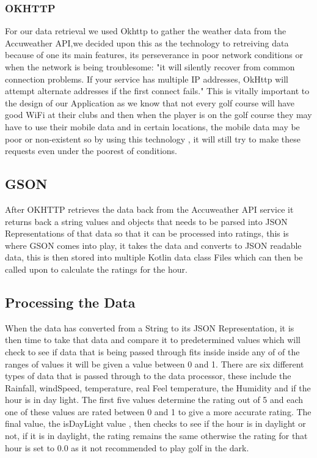 \subsubsection{OKHTTP}
For our data retrieval we used Okhttp to gather the weather data from the Accuweather API,we decided upon this as the technology to retreiving data because of one its main features, its perseverance in poor network conditions or when the network is being troublesome: "it will silently recover from common connection problems. If your service has multiple IP addresses, OkHttp will attempt alternate addresses if the first connect fails."\cite{ref1}
\newline
\newline
This is vitally important to the design of our Application as we know that not every golf course will have good WiFi at their clubs and then when the player is on the golf course they may have to use their mobile data and in certain locations, the mobile data may be poor or non-existent so by using this technology , it will still try to make these requests even under the poorest of conditions.

\subsection{GSON}
After OKHTTP retrieves the data back from the Accuweather API service it returns back a string values and objects that needs to be parsed into JSON Representations of that data so that it can be processed into ratings, this is where GSON comes into play, it takes the data and converts to JSON readable data, this is then stored into multiple Kotlin data class Files which can then be called upon to calculate the ratings for the hour.
\subsection {Processing the Data}
When the data has converted from a String to its JSON Representation, it is then time to take that data and compare it to predetermined values which will check to see if data that is being passed through fits inside inside any of of the ranges of values it will be given a value between 0 and 1.
\newline
\newline
There are six different types of data that is passed through to the data processor, these include the Rainfall, windSpeed, temperature, real Feel temperature, the Humidity and if the hour is in day light. The first five values determine the rating out of 5 and each one of these values are rated between 0 and 1 to give a more accurate rating. The final value, the isDayLight value , then checks to see if the hour is in daylight or not, if it is in daylight, the rating remains the same otherwise the rating for that hour is set to 0.0 as it not recommended to play golf in the dark.
